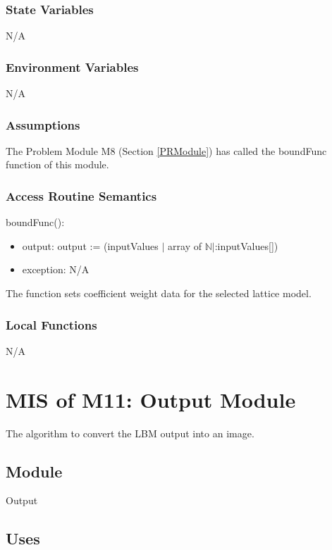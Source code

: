 \documentclass[12pt, titlepage]{article}
\begin{document}
\subsubsection{State Variables}

N/A

\subsubsection{Environment Variables}

N/A

\subsubsection{Assumptions}

The Problem Module M8 (Section \ref{PRModule}) has called the boundFunc function of this module.

\subsubsection{Access Routine Semantics}

\noindent boundFunc():
\begin{itemize}
	\item output: output := (inputValues $|$ array of $\mathbb{N}$$|$:inputValues[])
	\item exception: N/A
\end{itemize}

The function sets coefficient weight data for the selected lattice model.

\subsubsection{Local Functions}

N/A

\newpage

\section{MIS of M11: Output Module} \label{OUModule} 

The algorithm to convert the LBM output into an image.

\subsection{Module}

Output

\subsection{Uses}
\end{document}
